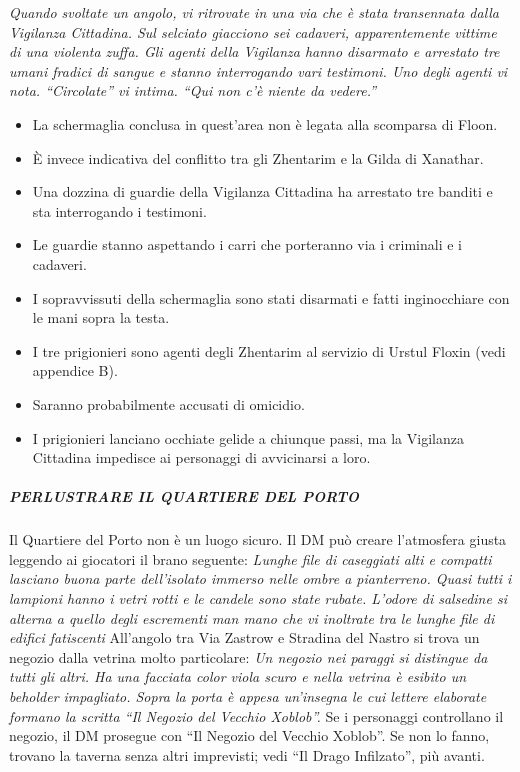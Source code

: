 \documentclass{article}
\begin{document}
                        \textit{Quando svoltate un angolo, vi ritrovate in una via che è stata transennata dalla Vigilanza Cittadina. Sul selciato giacciono sei cadaveri, apparentemente vittime di una violenta zuffa. Gli agenti della Vigilanza hanno disarmato e arrestato tre umani fradici di sangue e stanno interrogando vari testimoni. Uno degli agenti vi nota. 
                                “Circolate” vi intima. “Qui non c'è niente da vedere.”}
\newline
\begin{itemize}
    \item La schermaglia conclusa in quest'area non è legata alla scomparsa di Floon.
    \item È invece indicativa del conflitto tra gli Zhentarim e la Gilda di Xanathar.
    \item Una dozzina di guardie della Vigilanza Cittadina ha arrestato tre banditi e sta interrogando i testimoni.
    \item Le guardie stanno aspettando i carri che porteranno via i criminali e i cadaveri.
    \item I sopravvissuti della schermaglia sono stati disarmati e fatti inginocchiare con le mani sopra la testa.
    \item I tre prigionieri sono agenti degli Zhentarim al servizio di Urstul Floxin (vedi appendice B).
    \item Saranno probabilmente accusati di omicidio.
    \item I prigionieri lanciano occhiate gelide a chiunque passi, ma la Vigilanza Cittadina impedisce ai personaggi di avvicinarsi a loro.
\end{itemize}

                                          \subparagraph{PERLUSTRARE IL QUARTIERE DEL PORTO}Il Quartiere del Porto non è un luogo sicuro. Il DM può creare l'atmosfera giusta leggendo ai giocatori il brano seguente:\newline
                                                \textit{Lunghe file di caseggiati alti e compatti lasciano buona parte dell'isolato immerso nelle ombre a pianterreno. 
                                                Quasi tutti i lampioni hanno i vetri rotti e le candele sono state rubate. L'odore di salsedine si alterna a quello degli escrementi man mano che vi inoltrate tra le lunghe file di edifici fatiscenti}\newline
                                            All’angolo tra Via Zastrow e Stradina del Nastro si trova un negozio dalla vetrina molto particolare:\newline
                                                \textit{Un negozio nei paraggi si distingue da tutti gli altri. Ha una facciata color viola scuro e nella vetrina è esibito un beholder impagliato. Sopra la porta è appesa un'insegna le cui lettere elaborate formano la scritta “Il Negozio del Vecchio Xoblob”.}\newline
                                                Se i personaggi controllano il negozio, il DM prosegue con “Il Negozio del Vecchio Xoblob”. Se non lo fanno, trovano la taverna senza altri imprevisti; vedi “Il Drago Infilzato”, più avanti.
\end{document}
